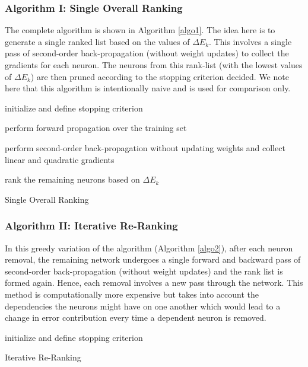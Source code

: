 \subsubsection{Algorithm I: Single Overall Ranking}
The complete algorithm is shown in Algorithm \ref{algo1}. The idea here is to generate a single ranked list based on the values of $\Delta E_{k}$. This involves a single pass of second-order back-propagation (without weight updates) to collect the gradients for each neuron. The neurons from this rank-list (with the lowest values of $\Delta E_{k}$) are then pruned according to the stopping criterion decided. We note here that this algorithm is intentionally naive and is used for comparison only. 

\begin{algorithm}
 initialize and define stopping criterion \;
 
 perform forward propagation over the training set \;
 
  perform second-order back-propagation without updating weights and collect linear and quadratic gradients \;
  
  rank the remaining neurons based on $\Delta E_{k}$\;
  
 \caption{Single Overall Ranking}
 \label{algo1}
\end{algorithm}
 
\subsubsection{Algorithm II: Iterative Re-Ranking}

In this greedy variation of the algorithm (Algorithm \ref{algo2}), after each neuron removal, the remaining network undergoes a single forward and backward pass of second-order back-propagation (without weight updates) and the rank list is formed again. Hence, each removal involves a new pass through the network. This method is computationally more expensive but takes into account the dependencies the neurons might have on one another which would lead to a change in error contribution every time a dependent neuron is removed. 

\begin{algorithm}
 initialize and define stopping criterion \;
 
 \caption{Iterative Re-Ranking}
 \label{algo2}
\end{algorithm}
